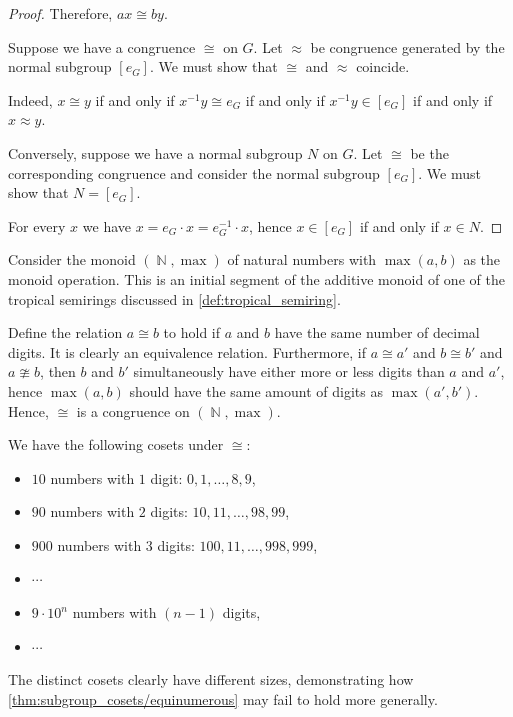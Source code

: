 \begin{proof}
  Therefore, \( ax \cong by \).


   Suppose we have a congruence \( {\cong} \) on \( G \). Let \( {\approx} \) be congruence generated by the normal subgroup \( [e_G] \). We must show that \( {\cong} \) and \( {\approx} \) coincide.

  Indeed, \( x \cong y \) if and only if \( x^{-1} y \cong e_G \) if and only if \( x^{-1} y \in [e_G] \) if and only if \( x \approx y \).

   Conversely, suppose we have a normal subgroup \( N \) on \( G \). Let \( {\cong} \) be the corresponding congruence and consider the normal subgroup \( [e_G] \). We must show that \( N = [e_G] \).

  For every \( x \) we have \( x = e_G \cdot x = e_G^{-1} \cdot x \), hence \( x \in [e_G] \) if and only if \( x \in N \).
\end{proof}

\begin{example}\label{ex:congruence_with_cosets_of_different_cardinality}
  Consider the monoid \( (\BbbN, \max) \) of natural numbers with \( \max(a, b) \) as the monoid operation. This is an initial segment of the additive monoid of one of the tropical semirings discussed in \cref{def:tropical_semiring}.

  Define the relation \( a \cong b \) to hold if \( a \) and \( b \) have the same number of decimal digits. It is clearly an equivalence relation. Furthermore, if \( a \cong a' \) and \( b \cong b' \) and \( a \ncong b \), then \( b \) and \( b' \) simultaneously have either more or less digits than \( a \) and \( a' \), hence \( \max(a, b) \) should have the same amount of digits as \( \max(a', b') \). Hence, \( {\cong} \) is a congruence on \( (\BbbN, \max) \).

  We have the following cosets under \( {\cong} \):
  \begin{itemize}
    \item \( 10 \) numbers with \( 1 \) digit: \( 0, 1, \ldots, 8, 9 \),
    \item \( 90 \) numbers with \( 2 \) digits: \( 10, 11, \ldots, 98, 99 \),
    \item \( 900 \) numbers with \( 3 \) digits: \( 100, 11, \ldots, 998, 999 \),
    \item \( \cdots \)
    \item \( 9 \cdot 10^n \) numbers with \( (n - 1) \) digits,
    \item \( \cdots \)
  \end{itemize}

  The distinct cosets clearly have different sizes, demonstrating how \cref{thm:subgroup_cosets/equinumerous} may fail to hold more generally.
\end{example}


